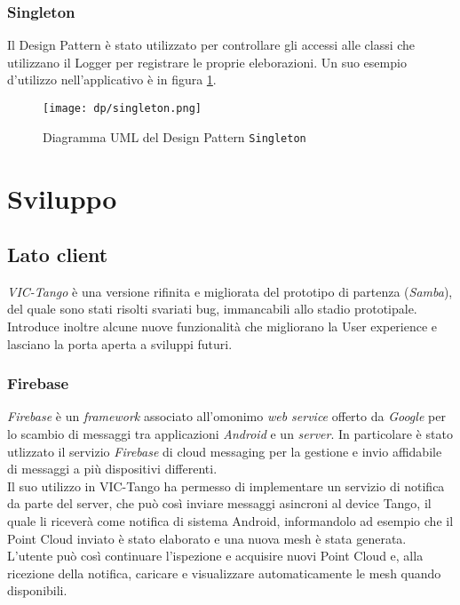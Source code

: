 \subsubsection{Singleton}
Il Design Pattern è stato utilizzato per controllare gli accessi alle classi che utilizzano il Logger per registrare le proprie eleborazioni. Un suo esempio d'utilizzo nell'applicativo è in figura \ref{fig:singleton}.
\begin{figure}[!h] 
    \centering 
    \texttt{[image: dp/singleton.png]} 
    \caption{Diagramma UML del Design Pattern \texttt{Singleton}}
   \label{fig:singleton}
\end{figure}
\newline

\section{Sviluppo}

\subsection{Lato client}
\emph{VIC-Tango} è una versione rifinita e migliorata del prototipo di partenza (\emph{Samba}), del quale sono stati risolti svariati bug, immancabili allo stadio prototipale. Introduce inoltre alcune nuove funzionalità che migliorano la User experience e lasciano la porta aperta a sviluppi futuri.

\subsubsection{Firebase}
\emph{Firebase} è un \emph{framework} associato all'omonimo \emph{web service} offerto da \emph{Google} per lo scambio di messaggi tra applicazioni \emph{Android} e un \emph{server}. In particolare è stato utlizzato il servizio \emph{Firebase} di cloud messaging per la gestione e invio affidabile di messaggi a più dispositivi differenti.\\ Il suo utilizzo in VIC-Tango ha permesso di implementare un servizio di notifica da parte del server, che può così inviare messaggi asincroni al device Tango, il quale li riceverà come notifica di sistema Android, informandolo ad esempio che il Point Cloud inviato è stato elaborato e una nuova mesh è stata generata. L'utente può così continuare l'ispezione e acquisire nuovi Point Cloud e, alla ricezione della notifica, caricare e visualizzare automaticamente le mesh quando disponibili.


